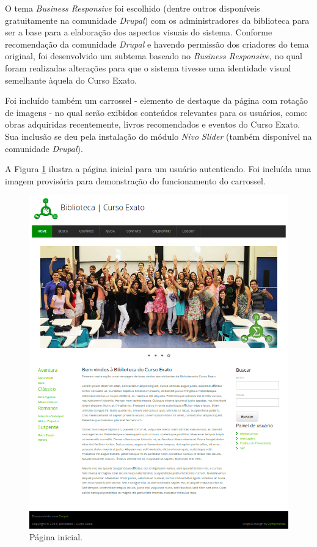 \documentclass[a4paper]{article}
\begin{document}
O tema \textit{Business Responsive} foi escolhido (dentre outros disponíveis gratuitamente na comunidade \textit{Drupal}) com os administradores da biblioteca para ser a base para a elaboração dos aspectos visuais do sistema. Conforme recomendação da comunidade \textit{Drupal} e havendo permissão dos criadores do tema original, foi desenvolvido um subtema baseado no \textit{Business Responsive}, no qual foram realizadas alterações para que o sistema tivesse uma identidade visual semelhante àquela do Curso Exato.

Foi incluído também um carrossel - elemento de destaque da página com rotação de imagens - no qual serão exibidos conteúdos relevantes para os usuários, como: obras adquiridas recentemente, livros recomendados e eventos do Curso Exato. Sua inclusão se deu pela instalação do módulo \textit{Nivo Slider} (também disponível na comunidade \textit{Drupal}).

A Figura \ref{home} ilustra a página inicial para um usuário autenticado. Foi incluída uma imagem provisória para demonstração do funcionamento do carrossel.

\begin{figure}[pbth!]
\centering
\caption{Página inicial.\label{home}}
\includegraphics[width=140mm]{img/home-small.png}
\end{figure}
\end{document}
